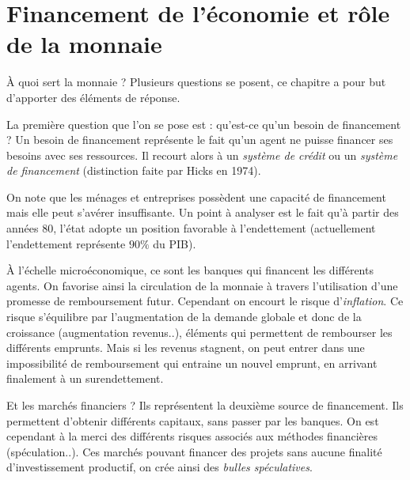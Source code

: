 
\section{Financement de l'économie et rôle de la monnaie} %

\label{prt:financement_de_l_economie_et_role_de_la_monnaie}

À quoi sert la monnaie ? Plusieurs questions se posent, ce chapitre a pour but d'apporter des éléments de réponse. 

La première question que l'on se pose est : qu'est-ce qu'un besoin de financement ? 
Un besoin de financement représente le fait qu'un agent ne puisse financer ses besoins avec ses ressources. Il recourt alors à un \emph{système de crédit} ou un 
\emph{système de financement} (distinction faite par Hicks en 1974).

On note que les ménages et entreprises possèdent une capacité de financement mais elle peut s'avérer insuffisante. Un point à analyser est le fait qu'à partir 
des années 80, l'état adopte un position favorable à l'endettement (actuellement l'endettement représente $90\%$ du PIB).

À l'échelle microéconomique,  ce sont les banques qui financent les différents agents. On favorise ainsi la circulation de la monnaie à travers l'utilisation d'une promesse de
remboursement futur. Cependant on encourt le risque d'\emph{inflation}. Ce risque s'équilibre par l'augmentation de la demande globale et donc de la croissance 
(augmentation revenus..), éléments qui permettent de rembourser les différents emprunts. Mais si les revenus stagnent, on peut entrer dans une impossibilité de remboursement qui entraine un nouvel emprunt, en arrivant finalement à un surendettement.

Et les marchés financiers ? Ils représentent la deuxième source de financement. Ils permettent d'obtenir différents capitaux, sans passer par les banques. On 
est cependant à la merci des différents risques associés aux méthodes financières (spéculation..). Ces marchés pouvant financer des projets sans aucune finalité d'investissement productif, on crée ainsi des \emph{bulles spéculatives}.

